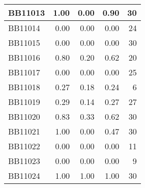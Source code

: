 \begin{longtable}{|l|r|r|r||r|}
	\hline
	BB11013 & \cellcolor[rgb]{ .988,  1,  .992}1.00 & \cellcolor[rgb]{ .384,  .745,  .478}0.00 & \cellcolor[rgb]{ .925,  .973,  .937}0.90 & \cellcolor[rgb]{ .973,  .412,  .42}30 \\
	\hline
	BB11014 & \cellcolor[rgb]{ .988,  1,  .992}0.00 & \cellcolor[rgb]{ .988,  1,  .992}0.00 & \cellcolor[rgb]{ .988,  1,  .992}0.00 & \cellcolor[rgb]{ .976,  .529,  .537}24 \\
	\hline
	BB11015 & \cellcolor[rgb]{ .988,  1,  .992}0.00 & \cellcolor[rgb]{ .988,  1,  .992}0.00 & \cellcolor[rgb]{ .988,  1,  .992}0.00 & \cellcolor[rgb]{ .973,  .412,  .42}30 \\
	\hline
	BB11016 & \cellcolor[rgb]{ .988,  1,  .992}0.80 & \cellcolor[rgb]{ .384,  .745,  .478}0.20 & \cellcolor[rgb]{ .804,  .922,  .835}0.62 & \cellcolor[rgb]{ .98,  .604,  .616}20 \\
	\hline
	BB11017 & \cellcolor[rgb]{ .988,  1,  .992}0.00 & \cellcolor[rgb]{ .988,  1,  .992}0.00 & \cellcolor[rgb]{ .988,  1,  .992}0.00 & \cellcolor[rgb]{ .976,  .51,  .518}25 \\
	\hline
	BB11018 & \cellcolor[rgb]{ .988,  1,  .992}0.27 & \cellcolor[rgb]{ .384,  .745,  .478}0.18 & \cellcolor[rgb]{ .784,  .914,  .82}0.24 & \cellcolor[rgb]{ .988,  .875,  .886}6 \\
	\hline
	BB11019 & \cellcolor[rgb]{ .988,  1,  .992}0.29 & \cellcolor[rgb]{ .384,  .745,  .478}0.14 & \cellcolor[rgb]{ .918,  .969,  .933}0.27 & \cellcolor[rgb]{ .976,  .471,  .478}27 \\
	\hline
	BB11020 & \cellcolor[rgb]{ .988,  1,  .992}0.83 & \cellcolor[rgb]{ .384,  .745,  .478}0.33 & \cellcolor[rgb]{ .729,  .89,  .773}0.62 & \cellcolor[rgb]{ .973,  .412,  .42}30 \\
	\hline
	BB11021 & \cellcolor[rgb]{ .988,  1,  .992}1.00 & \cellcolor[rgb]{ .384,  .745,  .478}0.00 & \cellcolor[rgb]{ .663,  .863,  .718}0.47 & \cellcolor[rgb]{ .973,  .412,  .42}30 \\
	\hline
	BB11022 & \cellcolor[rgb]{ .988,  1,  .992}0.00 & \cellcolor[rgb]{ .988,  1,  .992}0.00 & \cellcolor[rgb]{ .988,  1,  .992}0.00 & \cellcolor[rgb]{ .984,  .78,  .788}11 \\
	\hline
	BB11023 & \cellcolor[rgb]{ .988,  1,  .992}0.00 & \cellcolor[rgb]{ .988,  1,  .992}0.00 & \cellcolor[rgb]{ .988,  1,  .992}0.00 & \cellcolor[rgb]{ .984,  .816,  .827}9 \\
	\hline
	BB11024 & \cellcolor[rgb]{ .988,  1,  .992}1.00 & \cellcolor[rgb]{ .988,  1,  .992}1.00 & \cellcolor[rgb]{ .988,  1,  .992}1.00 & \cellcolor[rgb]{ .973,  .412,  .42}30 \\

\end{longtable}
